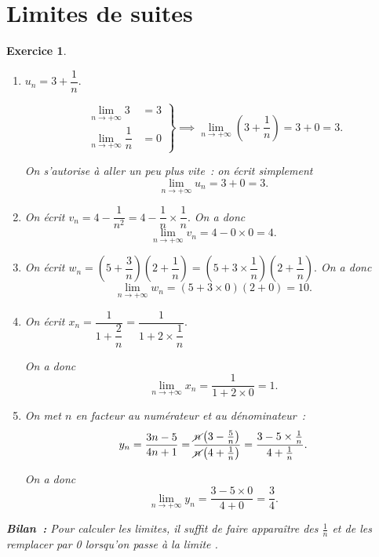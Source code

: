 \documentclass[10pt]{article}
\newtheorem{exo}{Exercice}
\begin{document}
\section{Limites de suites}


\begin{exo}



\begin{enumerate}
\item $u_n=3+\dfrac{1}{n}.$

\[
\left.
    \begin{array}{ll}
        \lim\limits_{n\to +\infty}3&= 3 \\
        \lim\limits_{n\to +\infty}\dfrac{1}{n}&= 0
    \end{array}
\right \}\implies \lim\limits_{n\to +\infty}\left(3+\dfrac{1}{n}\right)=3+0=3.
\]

On s'autorise à aller un peu plus vite~: on écrit simplement
\[\lim\limits_{n\to +\infty}u_n=3+0=3.\] 
\item On écrit $v_n=4-\dfrac{1}{n^2}=4-\dfrac{1}{n}\times \dfrac{1}{n}.$ On a donc
\[\lim\limits_{n\to +\infty}v_n=4-0\times 0=4.\] 

\item On écrit $w_n=\left(5+\dfrac{3}{n}\right)\left(2+\dfrac{1}{n}\right)=\left(5+3\times \dfrac{1}{n}\right)\left(2+\dfrac{1}{n}\right).$ On a donc
\[\lim\limits_{n\to +\infty}w_n=\left(5+3\times 0\right)\left(2+0\right)=10.\] 


\item On écrit $x_n=\dfrac{1}{1+\dfrac{2}{n}}=\dfrac{1}{1+2\times \dfrac{1}{n}}.$

On a donc
\[\lim\limits_{n\to +\infty}x_n=\dfrac{1}{1+2\times 0}=1.\] 
\item On met $n$ en facteur au numérateur et au dénominateur~:
\[
y_n=\dfrac{3n-5}{4n+1}
=\dfrac{\cancel{n}\left(3-\frac{5}{n}\right)}{\cancel{n}\left(4+\frac{1}{n}\right)}
=\dfrac{3-5\times \frac{1}{n}}{4+\frac{1}{n}}.
\]

On a donc
\[\lim\limits_{n\to +\infty}y_n=\dfrac{3-5\times 0}{4+0}=\dfrac{3}{4}.\]


\end{enumerate}

\medskip

\textbf{Bilan~:} Pour calculer les limites, il suffit de faire apparaître des $\frac{1}{n}$ et de les remplacer par 0 lorsqu'on \og passe à la limite \fg.

\end{exo}
\end{document}
